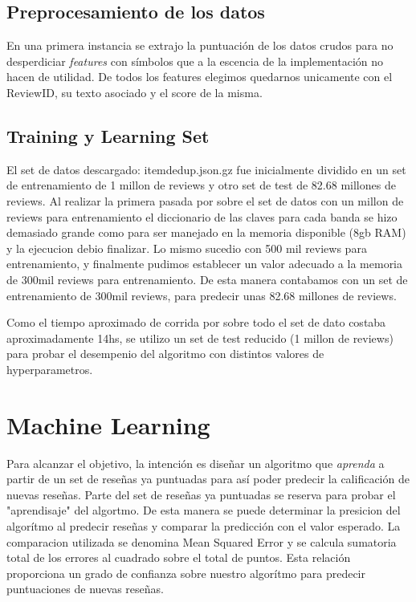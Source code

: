 \documentclass[a4paper,10pt]{article}
\begin{document}
	\subsection{Preprocesamiento de los datos}	

	En una primera instancia se extrajo la puntuaci\'{o}n de los datos crudos para no desperdiciar \textit{features} con s\'{i}mbolos que a la escencia de la implementaci\'{o}n no hacen de utilidad. De todos los features elegimos quedarnos unicamente con el ReviewID, su texto asociado y el score de la misma. 
	
	
	\subsection{Training y Learning Set}
	
	El set de datos descargado: itemdedup.json.gz fue inicialmente dividido en un set de entrenamiento de 1 millon de reviews y otro set de test de 82.68 millones de reviews. Al realizar la primera pasada por sobre el set de datos con un millon de reviews para entrenamiento el diccionario de las claves para cada banda se hizo demasiado grande como para ser manejado en la memoria disponible (8gb RAM) y la ejecucion debio finalizar. Lo mismo sucedio con 500 mil reviews para entrenamiento, y finalmente pudimos establecer un valor adecuado a la memoria de 300mil reviews para entrenamiento. De esta manera contabamos con un set de entrenamiento de 300mil reviews, para predecir unas 82.68 millones de reviews.
	
	Como el tiempo aproximado de corrida por sobre todo el set de dato costaba aproximadamente 14hs, se utilizo un set de test reducido (1 millon de reviews) para probar el desempenio del algoritmo con distintos valores de hyperparametros.
	
	\section{Machine Learning}
	
	Para alcanzar el objetivo, la intenci\'{o}n es dise\~{n}ar un algoritmo que \textit{aprenda} a partir de un set de rese\~{n}as ya puntuadas para as\'{i} poder predecir la calificaci\'{o}n de nuevas rese\~{n}as. Parte del set de rese\~{n}as ya puntuadas se reserva para probar el "aprendisaje" del algortmo. De esta manera se puede determinar la presicion del algor\'{i}tmo al predecir rese\~{n}as y comparar la predicci\'{o}n con el valor esperado. La comparacion utilizada se denomina Mean Squared Error y se calcula sumatoria total de los errores al cuadrado sobre el total de puntos. Esta relaci\'{o}n proporciona un grado de confianza sobre nuestro algor\'{i}tmo para predecir puntuaciones de nuevas rese\~{n}as.
\end{document}
